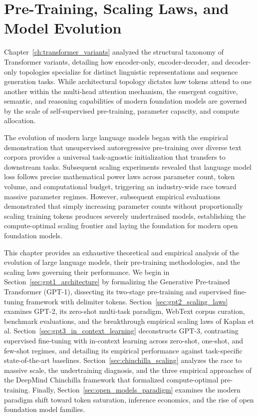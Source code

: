 \documentclass[../../main.tex]{subfiles}
\begin{document}
\chapter{Pre-Training, Scaling Laws, and Model Evolution}
\label{ch:scaling_laws_pretraining}

Chapter~\ref{ch:transformer_variants} analyzed the structural taxonomy of Transformer variants, detailing how encoder-only, encoder-decoder, and decoder-only topologies specialize for distinct linguistic representations and sequence generation tasks. While architectural topology dictates how tokens attend to one another within the multi-head attention mechanism, the emergent cognitive, semantic, and reasoning capabilities of modern foundation models are governed by the scale of self-supervised pre-training, parameter capacity, and compute allocation.

The evolution of modern large language models began with the empirical demonstration that unsupervised autoregressive pre-training over diverse text corpora provides a universal task-agnostic initialization that transfers to downstream tasks. Subsequent scaling experiments revealed that language model loss follows precise mathematical power laws across parameter count, token volume, and computational budget, triggering an industry-wide race toward massive parameter regimes. However, subsequent empirical evaluations demonstrated that simply increasing parameter counts without proportionally scaling training tokens produces severely undertrained models, establishing the compute-optimal scaling frontier and laying the foundation for modern open foundation models.

This chapter provides an exhaustive theoretical and empirical analysis of the evolution of large language models, their pre-training methodologies, and the scaling laws governing their performance. We begin in Section~\ref{sec:gpt1_architecture} by formalizing the Generative Pre-trained Transformer (GPT-1), dissecting its two-stage pre-training and supervised fine-tuning framework with delimiter tokens. Section~\ref{sec:gpt2_scaling_laws} examines GPT-2, its zero-shot multi-task paradigm, WebText corpus curation, benchmark evaluations, and the breakthrough empirical scaling laws of Kaplan et al. Section~\ref{sec:gpt3_in_context_learning} deconstructs GPT-3, contrasting supervised fine-tuning with in-context learning across zero-shot, one-shot, and few-shot regimes, and detailing its empirical performance against task-specific state-of-the-art baselines. Section~\ref{sec:chinchilla_scaling} analyzes the race to massive scale, the undertraining diagnosis, and the three empirical approaches of the DeepMind Chinchilla framework that formalized compute-optimal pre-training. Finally, Section~\ref{sec:open_models_paradigm} examines the modern paradigm shift toward token saturation, inference economics, and the rise of open foundation model families.
\end{document}
